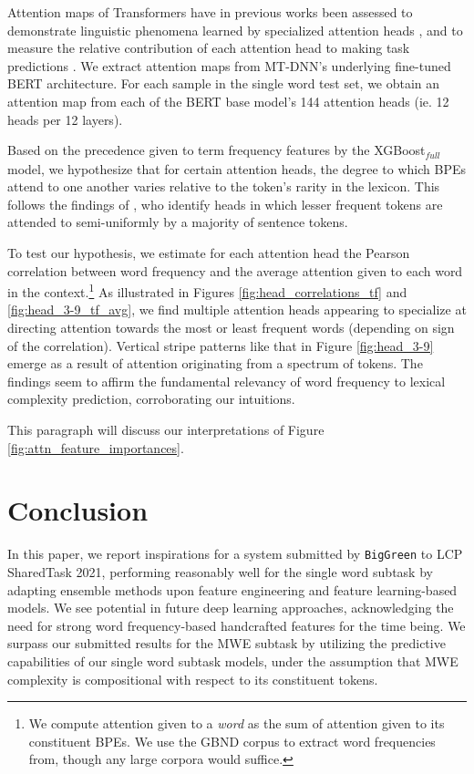 \documentclass{dcthesis}
\theoremstyle{definition}
\theoremstyle{remark}
\begin{document}
Attention maps of Transformers have in previous works been assessed to demonstrate linguistic phenomena learned by specialized attention heads \citep{voita2019analyzing, clark2019does}, and to measure the relative contribution of each attention head to making task predictions \citep{voita2019analyzing, michel2019sixteen}. We extract attention maps from MT-DNN's underlying fine-tuned BERT architecture. For each sample in the single word test set, we obtain an attention map from each of the BERT base model's 144 attention heads (ie. 12 heads per 12 layers).

Based on the precedence given to term frequency features by the XGBoost$_\textit{full}$ model, we hypothesize that for certain attention heads, the degree to which BPEs attend to one another varies relative to the token's rarity in the lexicon. This follows the findings of \citealp{voita2019analyzing}, who identify heads in which lesser frequent tokens are attended to semi-uniformly by a majority of sentence tokens. 

To test our hypothesis, we estimate for each attention head the Pearson correlation between word frequency and the average attention given to each word in the context.\footnote{We compute attention given to a \textit{word} as the sum of attention given to its constituent BPEs. We use the GBND corpus to extract word frequencies from, though any large corpora would suffice.} As illustrated in Figures \ref{fig:head_correlations_tf} and \ref{fig:head_3-9_tf_avg}, we find multiple attention heads appearing to specialize at directing attention towards the most or least frequent words (depending on sign of the correlation). Vertical stripe patterns like that in Figure \ref{fig:head_3-9} emerge as a result of attention originating from a spectrum of tokens. The findings seem to affirm the fundamental relevancy of word frequency to lexical complexity prediction, corroborating our intuitions.

This paragraph will discuss our interpretations of Figure \ref{fig:attn_feature_importances}.

\chapter{Conclusion}

In this paper, we report inspirations for a system submitted by \texttt{BigGreen} to LCP SharedTask 2021, performing reasonably well for the single word subtask by adapting ensemble methods upon feature engineering and feature learning-based models. We see potential in future deep learning approaches, acknowledging the need for strong word frequency-based handcrafted features for the time being. We surpass our submitted results for the MWE subtask by utilizing the predictive capabilities of our single word subtask models, under the assumption that MWE complexity is compositional with respect to its constituent tokens.
\end{document}
